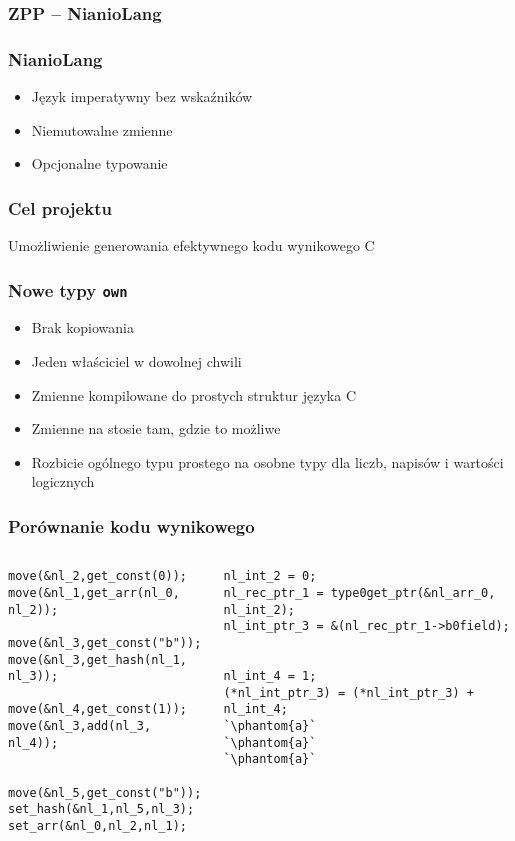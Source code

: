 \documentclass{beamer}
\begin{document}
	\begin{frame}
		\frametitle{ZPP -- NianioLang}
		
	\end{frame}
	
	\begin{frame}
		\frametitle{NianioLang}
		\begin{itemize}
		 \item Język imperatywny bez wskaźników
		 \item Niemutowalne zmienne
		 \item Opcjonalne typowanie
		\end{itemize}
	\end{frame}
	
	\begin{frame}
		\frametitle{Cel projektu}
		Umożliwienie generowania efektywnego kodu wynikowego C
	\end{frame}
	
	\begin{frame}
		\frametitle{Nowe typy \texttt{own}}
		\begin{itemize}
		 \item Brak kopiowania
		 \item Jeden właściciel w dowolnej chwili
		 \item Zmienne kompilowane do prostych struktur języka C
		 \item Zmienne na stosie tam, gdzie to możliwe
		 \item Rozbicie ogólnego typu prostego na osobne typy dla liczb, napisów i wartości logicznych
		\end{itemize}
	\end{frame}
	
	\begin{frame}[fragile]
		\frametitle{Porównanie kodu wynikowego}
		\center{\texttt{a[0]->b++}}
			\pause
		\begin{columns}
			\begin{column}{0.50\textwidth}
				\lstset{language=C}
				\begin{lstlisting}
move(&nl_2,get_const(0));
move(&nl_1,get_arr(nl_0, nl_2));

move(&nl_3,get_const("b"));
move(&nl_3,get_hash(nl_1, nl_3));

move(&nl_4,get_const(1));
move(&nl_3,add(nl_3, nl_4));


move(&nl_5,get_const("b"));
set_hash(&nl_1,nl_5,nl_3);
set_arr(&nl_0,nl_2,nl_1);
				\end{lstlisting}
			\end{column}
			\pause
			\begin{column}{0.50\textwidth}
				\lstset{language=C}
				\begin{lstlisting}
nl_int_2 = 0;
nl_rec_ptr_1 = type0get_ptr(&nl_arr_0, nl_int_2);
nl_int_ptr_3 = &(nl_rec_ptr_1->b0field);


nl_int_4 = 1;
(*nl_int_ptr_3) = (*nl_int_ptr_3) + nl_int_4;
`\phantom{a}`
`\phantom{a}`
`\phantom{a}`
				\end{lstlisting}
			\end{column}
		\end{columns}
	\end{frame}
	
\end{document}

